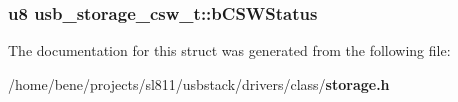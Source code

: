 \subsubsection{\setlength{\rightskip}{0pt plus 5cm}u8 {\bf usb\_\-storage\_\-csw\_\-t::b\-CSWStatus}}\label{structusb__storage__csw__t_8fa73c56f5f661bc74f777f721229470}




The documentation for this struct was generated from the following file:\begin{CompactItemize}
\item 
/home/bene/projects/sl811/usbstack/drivers/class/{\bf storage.h}\end{CompactItemize}
